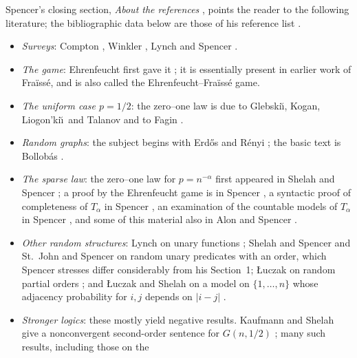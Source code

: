 Spencer's closing section, \emph{About the references}
\cite[pp.~27--28]{Spencer2007LogicRandomStructuresAuthor}, points the reader
to the following literature; the bibliographic data below are those of his
reference list \cite[pp.~28--30]{Spencer2007LogicRandomStructuresAuthor}.
\begin{itemize}
\item \emph{Surveys}: Compton \cite{Compton1988ZeroOneLaws}, Winkler
  \cite{Winkler1993RandomStructures}, Lynch \cite{Lynch1997RandomFiniteModels}
  and Spencer \cite{Spencer1993VariableProbability}.
\item \emph{The game}: Ehrenfeucht first gave it \cite{Ehrenfeucht1961}; it
  is essentially present in earlier work of Fra\"iss\'e, and is also called
  the Ehrenfeucht--Fra\"iss\'e game.
\item \emph{The uniform case \(p=1/2\)}: the zero--one law is due to
  Glebski\u\i, Kogan, Liogon'ki\u\i\ and Talanov \cite{GlebskiiEtAl1969}
  and to Fagin \cite{Fagin1976}.
\item \emph{Random graphs}: the subject begins with Erd\H{o}s and R\'enyi
  \cite{ErdosRenyi1960Evolution}; the basic text is Bollob\'as
  \cite{Bollobas1985RandomGraphs}.
\item \emph{The sparse law}: the zero--one law for \(p=n^{-\alpha}\) first
  appeared in Shelah and Spencer \cite{ShelahSpencer1988Sparse}; a proof by
  the Ehrenfeucht game is in Spencer \cite{Spencer1991EhrenfeuchtGame}, a
  syntactic proof of completeness of \(T_\alpha\) in Spencer
  \cite{Spencer1991Continuum}, an examination of the countable models of
  \(T_\alpha\) in Spencer \cite{Spencer1990CountableSparse}, and some of this
  material also in Alon and Spencer \cite{AlonSpencer1991ProbabilisticMethod}.
\item \emph{Other random structures}: Lynch on unary functions
  \cite{Lynch1985UnaryFunctions}; Shelah and Spencer
  \cite{ShelahSpencer1994UnaryPredicates} and St.~John and Spencer
  \cite{SpencerStJohn1998UnaryPredicates} on random unary predicates with an
  order, which Spencer stresses differ considerably from his Section~1;
  {\L}uczak on random partial orders \cite{Luczak1991Posets}; and {\L}uczak
  and Shelah on a model on \(\{1,\ldots,n\}\) whose adjacency probability for
  \(i,j\) depends on \(|i-j|\) \cite{LuczakShelah1995Homogeneous}.
\item \emph{Stronger logics}: these mostly yield negative results.  Kaufmann
  and Shelah give a nonconvergent second-order sentence for \(G(n,1/2)\)
  \cite{KaufmannShelah1983Monadic}; many such results, including those on the

\end{itemize}
